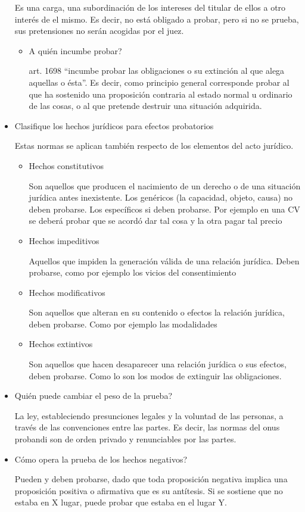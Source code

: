 \documentclass[]{article}
\begin{document}
\begin{itemize}
  Es una carga, una subordinación de los intereses del titular de ellos
  a otro interés de el mismo. Es decir, no está obligado a probar, pero
  si no se prueba, sus pretensiones no serán acogidas por el juez.

  \begin{itemize}
  \item
    A quién incumbe probar?

    art. 1698 ``incumbe probar las obligaciones o su extinción al que
    alega aquellas o ésta''. Es decir, como principio general
    corresponde probar al que ha sostenido una proposición contraria al
    estado normal u ordinario de las cosas, o al que pretende destruir
    una situación adquirida.
  \end{itemize}
\item
  Clasifique los hechos jurídicos para efectos probatorios

  Estas normas se aplican también respecto de los elementos del acto
  jurídico.

  \begin{itemize}
  \item
    Hechos constitutivos

    Son aquellos que producen el nacimiento de un derecho o de una
    situación jurídica antes inexistente. Los genéricos (la capacidad,
    objeto, causa) no deben probarse. Los específicos si deben probarse.
    Por ejemplo en una CV se deberá probar que se acordó dar tal cosa y
    la otra pagar tal precio
  \item
    Hechos impeditivos

    Aquellos que impiden la generación válida de una relación jurídica.
    Deben probarse, como por ejemplo los vicios del consentimiento
  \item
    Hechos modificativos

    Son aquellos que alteran en su contenido o efectos la relación
    jurídica, deben probarse. Como por ejemplo las modalidades
  \item
    Hechos extintivos

    Son aquellos que hacen desaparecer una relación jurídica o sus
    efectos, deben probarse. Como lo son los modos de extinguir las
    obligaciones.
  \end{itemize}
\item
  Quién puede cambiar el peso de la prueba?

  La ley, estableciendo presunciones legales y la voluntad de las
  personas, a través de las convenciones entre las partes. Es decir, las
  normas del onus probandi son de orden privado y renunciables por las
  partes.
\item
  Cómo opera la prueba de los hechos negativos?

  Pueden y deben probarse, dado que toda proposición negativa implica
  una proposición positiva o afirmativa que es su antítesis. Si se
  sostiene que no estaba en X lugar, puede probar que estaba en el lugar
  Y.
\end{itemize}
\end{document}
